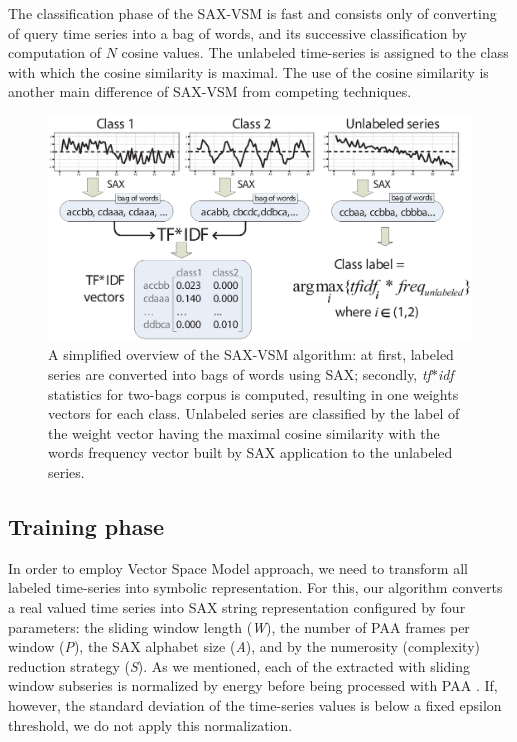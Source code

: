 \documentclass{llncs}
\begin{document}
The classification phase of the SAX-VSM is fast and consists only of converting of query time series
into a bag of words, and its successive classification by computation of $N$ cosine values. The
unlabeled time-series is assigned to the class with which the cosine similarity is maximal. 
The use of the cosine similarity is another main difference of SAX-VSM from competing techniques.

\begin{figure}[t]
   \centering
   \includegraphics[width=115mm]{figures/overview.eps}
   \caption{A simplified overview of the SAX-VSM algorithm: at first, labeled series are 
   converted into bags of words using SAX; 
   secondly, \textit{tf$\ast$idf} statistics for two-bags corpus is computed, resulting in 
   one weights vectors for each class.
   Unlabeled series are classified by the label of the weight vector having the maximal 
   cosine similarity with the words frequency vector built by SAX application to the 
   unlabeled series.}
   \label{fig:overview}
\end{figure}

\subsection{Training phase}
In order to employ Vector Space Model approach, we need to transform all labeled time-series into 
symbolic representation.  For this, our algorithm converts a real valued time series into SAX 
string representation configured by four parameters: the sliding window
length (\textit{W}), the number of PAA frames per window (\textit{P}), the SAX alphabet size
(\textit{A}), and by the numerosity (complexity) reduction strategy (\textit{S}). 
As we mentioned, each of the extracted with sliding window subseries is normalized by energy before
being processed with PAA \cite{goldin_kanellakis}. If, however, the standard deviation of the
time-series values is below a fixed epsilon threshold, we do not apply this normalization.
\end{document}
